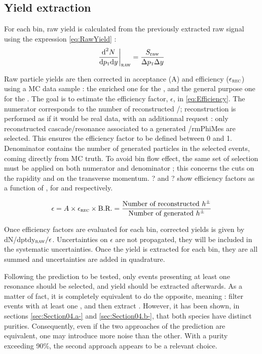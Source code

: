 \subsection{Yield extraction}
\label{sec:Section04.c-}

For each \pT bin, raw yield is calculated from the previously extracted raw signal using the expression \eq \ref{eq:RawYield} :
\begin{equation}
\frac{\text{d}^2 N}{\text{d}p_{\text{\textsc{t}}} \text{d} y} \bigg\rvert_\textsc{raw} = \frac{S_\text{raw}}{\Delta p_{\text{\textsc{t}}} \Delta y}
\end{equation}\label{eq:RawYield}

Raw particle yields are then corrected in acceptance (A) and efficiency ($\epsilon_\textsc{rec}$) using a MC data sample : the enriched one for the \rmOmega, and the general purpose one for the \rmPhiMes. The goal is to estimate the efficiency factor, $\epsilon$, in \eq \ref{eq:Efficiency}. The numerator corresponds to the number of reconstructed \rmOmega/\rmPhiMes; reconstruction is performed as if it would be real data, with an additionnal request : only reconstructed cascade/resonance associated to a generated \rmOmega/rmPhiMes are selected. This ensures the efficiency factor to be defined between 0 and 1. Denominator contains the number of generated particles in the selected events, coming directly from MC truth. To avoid bin flow effect, the same set of selection must be applied on both numerator and denominator ; this concerns the cuts on the rapidity and on the transverse momentum. \fig ? and ? show efficiency factors as a function of \pT, for \rmOmega and \rmPhiMes respectively.

\begin{equation}
\epsilon = A\times \epsilon_\textsc{rec} \times \text{B.R.} = \frac{\text{Number of reconstructed \ensuremath{h^{\pm}}}}{\text{Number of generated \ensuremath{h^{\pm}}}}
\end{equation}
\label{eq:Efficiency}

Once efficiency factors are evaluated for each \pT bin, corrected yields is given by dN/dptdy$_\textsc{raw}/\epsilon$. Uncertainties on $\epsilon$ are not propagated, they will be included in the systematic uncertainties. Once the yield is extracted for each \pT bin, they are all summed and uncertainties are added in quadrature. 

Following the prediction to be tested, only events presenting at least one \rmPhiMes resonance should be selected, and \rmOmega yield should be extracted afterwards. As a matter of fact, it is completely equivalent to do the opposite, meaning : filter events with at least one \rmOmega, and then extract \rmPhiMes. However, it has been shown, in sections \ref{sec:Section04.a-} and \ref{sec:Section04.b-}, that both species have distinct purities. Consequently, even if the two approaches of the \Pythiaeight prediction are equivalent, one may introduce more noise than the other. With a purity exceeding 90\%, the second approach appears to be a relevant choice. 
